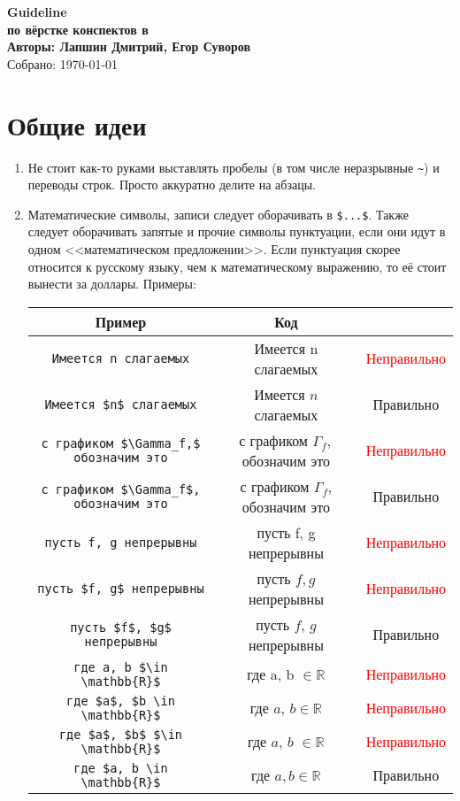 \documentclass[12pt,a4paper]{book}
\newcommand{\ok}{& \textcolor{green!60!black}{Правильно}}
\newcommand{\bad}{& \textcolor{red}{Неправильно}}
\begin{document}
\begin{center}
{\huge \bf Guideline} \\
{\Large \bf по вёрстке конспектов в \XeLaTeX} \\
\vspace{0.5em}
{\large \bf Авторы: Лапшин Дмитрий, Егор Суворов} \\
\vspace{0.5em}
{Собрано: \today~\currenttime} \\
\end{center}

\section{Общие идеи}
\begin{enumerate}
\item Не стоит как-то руками выставлять пробелы (в том числе неразрывные \verb'~') и переводы строк. Просто аккуратно делите на абзацы.
\item Математические символы, записи следует оборачивать в \verb'$...$'. Также следует оборачивать запятые
и прочие символы пунктуации, если они идут в одном <<математическом предложении>>. Если пунктуация
скорее относится к русскому языку, чем к математическому выражению, то её стоит вынести за доллары. Примеры:

\begin{center}\begin{tabular}{|c|c|c|}
\hline Пример & Код & \\
\hline \verb!Имеется n слагаемых! & Имеется n слагаемых \bad \\
\hline \verb!Имеется $n$ слагаемых! & Имеется $n$ слагаемых \ok \\
\hline \verb!с графиком $\Gamma_f,$ обозначим это! & с графиком $\Gamma_f,$ обозначим это \bad \\
\hline \verb!с графиком $\Gamma_f$, обозначим это! & с графиком $\Gamma_f$, обозначим это \ok \\
\hline \verb!пусть f, g непрерывны! & пусть f, g непрерывны \bad \\
\hline \verb!пусть $f, g$ непрерывны! & пусть $f, g$ непрерывны \bad \\
\hline \verb!пусть $f$, $g$ непрерывны! & пусть $f$, $g$ непрерывны \ok \\
\hline \verb!где a, b $\in \mathbb{R}$! & где a, b $\in \mathbb{R}$ \bad \\
\hline \verb!где $a$, $b \in \mathbb{R}$! & где $a$, $b \in \mathbb{R}$ \bad \\
\hline \verb!где $a$, $b$ $\in \mathbb{R}$! & где $a$, $b$ $\in \mathbb{R}$ \bad \\
\hline \verb!где $a, b \in \mathbb{R}$! & где $a, b \in \mathbb{R}$ \ok \\
\hline 
\end{tabular}\end{center}


\end{enumerate}
\end{document}
